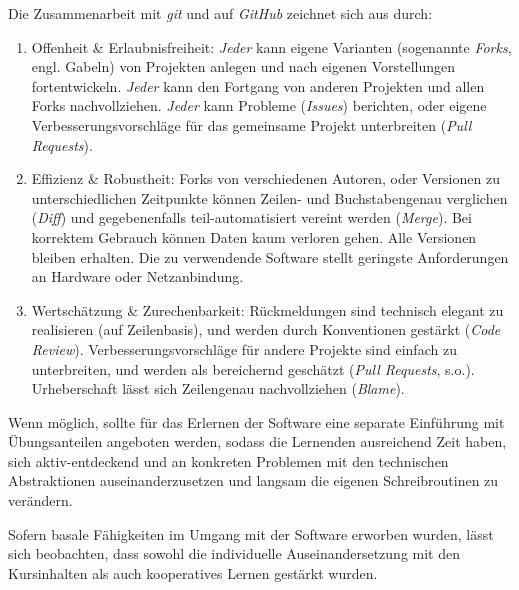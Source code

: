 \documentclass
	[
		11pt,
		a4paper,
		oneside,
		ngerman
	]
	{article}
\begin{document}
Die Zusammenarbeit mit \emph{git} und auf \emph{GitHub} zeichnet sich aus durch:
\begin{enumerate}
	\item Offenheit \& Erlaubnisfreiheit:
		\emph{Jeder} kann eigene Varianten (sogenannte \emph{Forks}, engl. Gabeln) von Projekten anlegen und nach eigenen Vorstellungen fortentwickeln.
		\emph{Jeder} kann den Fortgang von anderen Projekten und allen Forks nachvollziehen.
		\emph{Jeder} kann Probleme (\emph{Issues}) berichten, oder eigene Verbesserungsvorschläge für das gemeinsame Projekt unterbreiten (\emph{Pull Requests}).
	\item Effizienz \& Robustheit:
		Forks von verschiedenen Autoren, oder Versionen zu unterschiedlichen Zeitpunkte können Zeilen- und Buchstabengenau verglichen (\emph{Diff}) und gegebenenfalls teil-automatisiert vereint werden (\emph{Merge}).
		Bei korrektem Gebrauch können Daten kaum verloren gehen.
		Alle Versionen bleiben erhalten.
		Die zu verwendende Software stellt geringste Anforderungen an Hardware oder Netzanbindung.
	\item Wertschätzung \& Zurechenbarkeit:
		Rückmeldungen sind technisch elegant zu realisieren (auf Zeilenbasis), und werden durch Konventionen gestärkt (\emph{Code Review}).
		Verbesserungsvorschläge für andere Projekte sind einfach zu unterbreiten, und werden als bereichernd geschätzt (\emph{Pull Requests}, s.o.).
		Urheberschaft lässt sich Zeilengenau nachvollziehen (\emph{Blame}).
\end{enumerate}

Wenn möglich, sollte für das Erlernen der Software eine separate Einführung mit Übungsanteilen angeboten werden, sodass die Lernenden ausreichend Zeit haben, sich aktiv-entdeckend und an konkreten Problemen mit den technischen Abstraktionen auseinanderzusetzen und langsam die eigenen Schreibroutinen zu verändern.

Sofern basale Fähigkeiten im Umgang mit der Software erworben wurden, lässt sich beobachten, dass sowohl die individuelle Auseinandersetzung mit den Kursinhalten als auch kooperatives Lernen \citep[vgl.][]{johnson-1999} gestärkt wurden.
\end{document}
